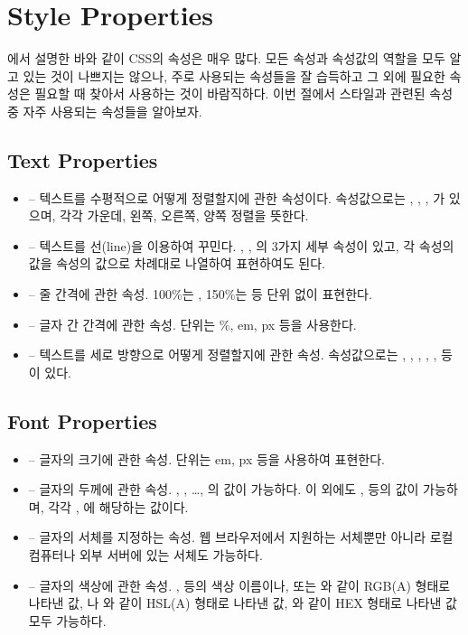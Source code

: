 \section{Style Properties}\label{sect:style-properties}

에서 설명한 바와 같이 CSS의 속성은 매우 많다. 모든 속성과 속성값의 역할을 모두 알고 있는 것이 나쁘지는 않으나, 주로 사용되는 속성들을 잘 습득하고 그 외에 필요한 속성은 필요할 때 찾아서 사용하는 것이 바람직하다. 이번 절에서 스타일과 관련된 속성 중 자주 사용되는 속성들을 알아보자.

\subsection*{Text Properties}

\begin{itemize}
    \item {} – 텍스트를 수평적으로 어떻게 정렬할지에 관한 속성이다. 속성값으로는 , , , 가 있으며, 각각 가운데, 왼쪽, 오른쪽, 양쪽 정렬을 뜻한다.
    \item {} – 텍스트를 선(line)을 이용하여 꾸민다. , , 의 3가지 세부 속성이 있고, 각 속성의 값을  속성의 값으로 차례대로 나열하여 표현하여도 된다.	
    \item {} – 줄 간격에 관한 속성. 100\%는 , 150\%는  등 단위 없이 표현한다.
    \item {} – 글자 간 간격에 관한 속성. 단위는 \%, em, px 등을 사용한다.
    \item {} – 텍스트를 세로 방향으로 어떻게 정렬할지에 관한 속성. 속성값으로는 , , , , ,  등이 있다.
\end{itemize}

\subsection*{Font Properties}

\begin{itemize}
    \item {} – 글자의 크기에 관한 속성. 단위는 em, px 등을 사용하여 표현한다.
    \item {} – 글자의 두께에 관한 속성. , , \ldots, 의 값이 가능하다. 이 외에도 ,  등의 값이 가능하며, 각각 , 에 해당하는 값이다.
    \item {} – 글자의 서체를 지정하는 속성. 웹 브라우저에서 지원하는 서체뿐만 아니라 로컬 컴퓨터나 외부 서버에 있는 서체도 가능하다.
    \item {} – 글자의 색상에 관한 속성. ,  등의 색상 이름이나,  또는 와 같이 RGB(A) 형태로 나타낸 값, 나 와 같이 HSL(A) 형태로 나타낸 값, 와 같이 HEX 형태로 나타낸 값 모두 가능하다.
\end{itemize}

